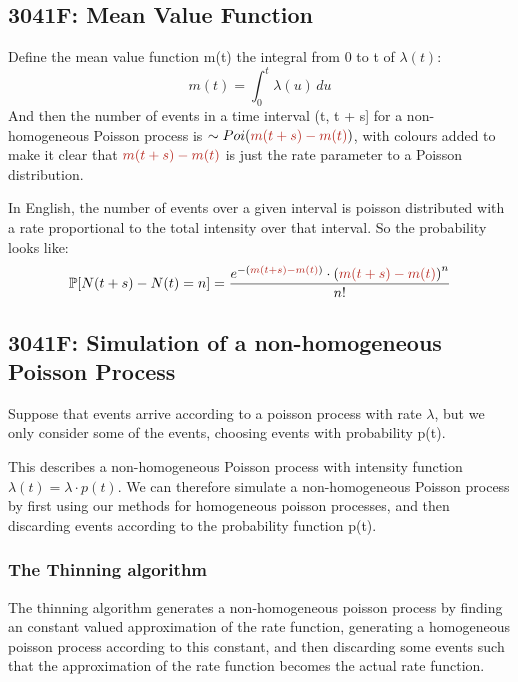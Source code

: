 \documentclass[12pt]{article}
\begin{document}
\subsection{3041F: Mean Value Function}
Define the mean value function m(t) the integral from 0 to t of \(\lambda(t)\):
\begin{equation*}
    m(t) = \int_{0}^{t} \lambda(u) \, du
\end{equation*}
And then the number of events in a time interval (t, t + s] for a non-homogeneous Poisson 
process is \(\sim Poi({\color{BrickRed}{m(t + s) - m(t)}})\), with 
colours added to make it clear that \({\color{BrickRed}{m(t + s) - m(t)}}\) is just the 
rate parameter to a Poisson distribution.


In English, the number of events over a given interval is poisson 
distributed with a rate proportional to the total intensity over that interval. So the probability looks like:
\begin{equation*}
    \begin{aligned}
        \mathbb{P}[N(t + s) - N(t) = n] &= \frac{
            e^{-\left({\color{BrickRed}{m(t+s) - m(t)}}\right)} 
            \cdot \left( {\color{BrickRed}{m(t+s) - m(t)}}\right)^n
        }{n!} \\
        \end{aligned}
    \end{equation*}
    \subsection{3041F: Simulation of a non-homogeneous Poisson Process}
    Suppose that events arrive according to a poisson process with rate \(\lambda\), but we only consider some of the events, choosing events with probability p(t).\newline \newline

    This describes a non-homogeneous Poisson process with intensity function \(\lambda(t) = \lambda \cdot p(t)\). 
    We can therefore simulate a non-homogeneous Poisson process by first using our methods for homogeneous poisson processes, and then discarding events according to the probability function p(t).  \newline \newline

    \subsubsection{The Thinning algorithm}
    The thinning algorithm generates a non-homogeneous poisson process by finding an constant valued 
    approximation of the rate function, generating a homogeneous poisson process according to this 
    constant, and then discarding some events such that the approximation of the rate function 
    becomes the actual rate function.
\end{document}
